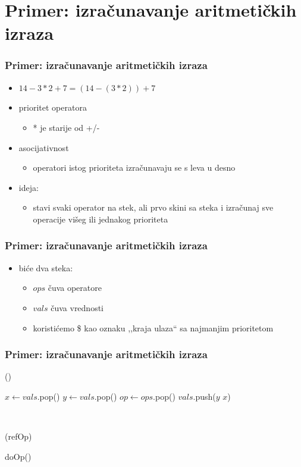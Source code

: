 \documentclass[compress,aspectratio=169]{beamer}
\begin{document}
\section[P: Izrazi]{Primer: izračunavanje aritmetičkih izraza}
\begin{frame}[fragile]
  \frametitle{Primer: izračunavanje aritmetičkih izraza}
  \begin{itemize}
    \item $14 - 3 * 2 + 7 = (14 - (3 * 2)) + 7$
    \item prioritet operatora
    \begin{itemize}
      \item * je starije od +/-
    \end{itemize}
    \item asocijativnost
    \begin{itemize}
      \item operatori istog prioriteta izračunavaju se s leva u desno
    \end{itemize}
    \item ideja:
    \begin{itemize}
      \item stavi svaki operator na stek, ali prvo skini sa steka i izračunaj 
      sve operacije višeg ili jednakog prioriteta
    \end{itemize}
  \end{itemize}
\end{frame}

\begin{frame}[fragile]
  \frametitle{Primer: izračunavanje aritmetičkih izraza}
  \begin{itemize}
    \item biće dva steka:
    \begin{itemize}
      \item $ops$ čuva operatore
      \item $vals$ čuva vrednosti
      \item koristićemo \$ kao oznaku ,,kraja ulaza`` sa najmanjim prioritetom
    \end{itemize}
  \end{itemize}
\end{frame}

\begin{frame}[fragile]
  \frametitle{Primer: izračunavanje aritmetičkih izraza}
()
\begin{algorithmic}
\STATE $x \leftarrow vals$.pop()
\STATE $y \leftarrow vals$.pop()
\STATE $op \leftarrow ops$.pop()
\STATE $vals$.push($y$  $x$)
\end{algorithmic}

\ %

(refOp)
\begin{algorithmic}
  \STATE doOp()
\ENDWHILE
\end{algorithmic}
\end{frame}
\end{document}

